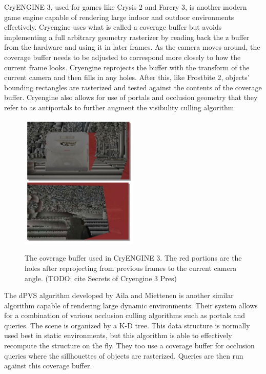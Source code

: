 \documentclass[12pt]{ucthesis}
\newcommand{\captionfonts}{\small\bf\ssp}
\begin{document}
CryENGINE 3, used for games like Crysis 2 and Farcry 3, is another modern game engine capable of rendering large indoor and outdoor environments effectively.\cite{cryengine3, Cryengine-culling-explained}
Cryengine uses what is called a coverage buffer but avoids implementing a full arbitrary geometry rasterizer by reading back the z buffer from the hardware and using it in later frames.
As the camera moves around, the coverage buffer needs to be adjusted to correspond more closely to how the current frame looks.
Cryengine reprojects the buffer with the transform of the current camera and then fills in any holes.
After this, like Frostbite 2, objects' bounding rectangles are rasterized and tested against the contents of the coverage buffer.
Cryengine also allows for use of portals and occlusion geometry that they refer to as antiportals to further augment the visibulity culling algorithm.

\begin{figure}
\begin{center}
\includegraphics[width=0.5\textwidth]{Images/CryCoverage.jpg}
\captionfonts
\caption[Cry Engine Coverage Buffer]{The coverage buffer used in CryENGINE 3.  The red portions are the holes after reprojecting from previous frames to the current camera angle. (TODO: cite Secrets of Cryengine 3 Pres)}
\label{fig:cry-coverage}
\end{center}
\end{figure}

The dPVS algorithm developed by Aila and Miettenen is another similar algorithm capable of rendering large dynamic environments.\cite{dpvs}
Their system allows for a combination of various occlusion culling algorithms such as portals and queries.
The scene is organized by a K-D tree.
This data structure is normally used best in static environments, but this algorithm is able to effectively recompute the structure on the fly.
They too use a coverage buffer for occlusion queries where the sillhouettes of objects are rasterized.
Queries are then run against this coverage buffer.
\end{document}
